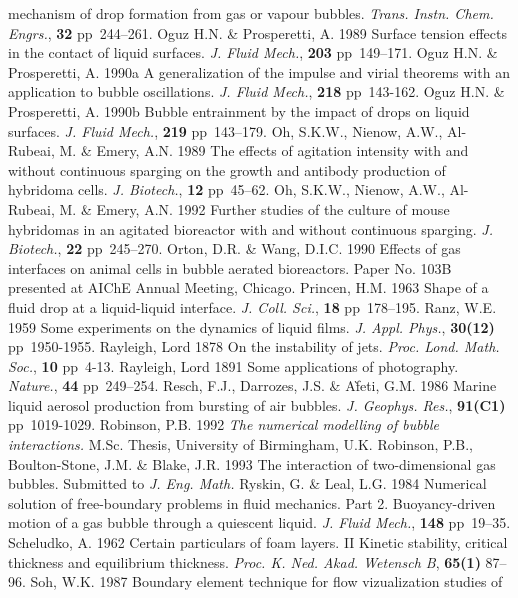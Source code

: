 mechanism
of drop formation from gas or vapour bubbles. {\sl Trans. Instn. Chem.
Engrs.}, {\bf 32} pp~244--261.
\vskip 8pt
Oguz H.N. \& Prosperetti, A. 1989 Surface tension effects in the 
contact of liquid surfaces. {\sl J. Fluid Mech.}, {\bf 203} pp~149--171.
\vskip 8pt
Oguz H.N. \& Prosperetti, A. 1990a A generalization of the impulse and virial
theorems with an application to bubble oscillations. 
{\sl J. Fluid Mech.}, {\bf 218} pp~143-162.
\vskip 8pt
Oguz H.N. \& Prosperetti, A. 1990b Bubble entrainment by the 
impact of drops on liquid surfaces. {\sl J. Fluid Mech.}, {\bf 
219} pp~143--179. 
\vskip 8pt
Oh, S.K.W., Nienow, A.W., Al-Rubeai, M. \& Emery, A.N. 1989 The effects of
agitation intensity with and without continuous sparging on the growth 
and antibody production of hybridoma cells. {\sl J. Biotech.}, {\bf 12}
pp~45--62.
\vskip 8pt
Oh, S.K.W., Nienow, A.W., Al-Rubeai, M. \& Emery, A.N. 1992 
Further studies of the culture
of mouse hybridomas in an agitated bioreactor with and
without continuous sparging.
{\sl J. Biotech.}, {\bf 22} pp~245--270. 
\vskip 8pt
Orton, D.R. \& Wang, D.I.C. 1990 Effects of gas interfaces
on animal cells in bubble aerated bioreactors. Paper No. 103B 
presented at AIChE Annual Meeting, Chicago.
\vskip 8pt
Princen, H.M. 1963 Shape of a fluid drop at a liquid-liquid interface.
{\sl J. Coll. Sci.}, {\bf 18} pp~178--195.
\vskip 8pt
Ranz, W.E. 1959 Some experiments on the dynamics of liquid films. {\sl J. Appl. 
Phys.}, {\bf 30(12)} pp~1950-1955.
\vskip 8pt
Rayleigh, Lord 1878 On the instability of jets. {\sl Proc. Lond. Math. Soc.},
{\bf 10} pp~4-13.
\vskip 8pt
Rayleigh, Lord 1891 Some applications of photography. {\sl Nature.}, 
{\bf 44} pp~249--254.
\vskip 8pt
Resch, F.J., Darrozes, J.S. \& A\`feti, G.M. 1986 Marine liquid aerosol production
from bursting of air bubbles. {\sl J. Geophys. Res.}, {\bf 91(C1)} pp~1019-1029.
\vskip 8pt
Robinson, P.B. 1992 {\sl The numerical modelling of bubble interactions.}
M.Sc. Thesis, University of Birmingham, U.K.
\vskip 8pt
Robinson, P.B., Boulton-Stone, J.M. \& Blake, J.R. 1993
The interaction of 
two-dimensional gas bubbles. Submitted to {\sl J. Eng. Math.}
\vskip 8pt
Ryskin, G. \& Leal, L.G. 1984 Numerical solution of free-boundary problems
in fluid mechanics. Part 2. Buoyancy-driven motion of a gas bubble through
a quiescent liquid. {\sl J. Fluid Mech.}, {\bf 148} pp~19--35.
\vskip 8pt
Scheludko, A. 1962 Certain particulars of foam layers. II
Kinetic stability, critical thickness and equilibrium thickness.
{\sl Proc. K. Ned. Akad. Wetensch B}, {\bf 65(1)} 87--96.
\vskip 8pt
Soh, W.K. 1987 Boundary element technique for flow vizualization studies of
